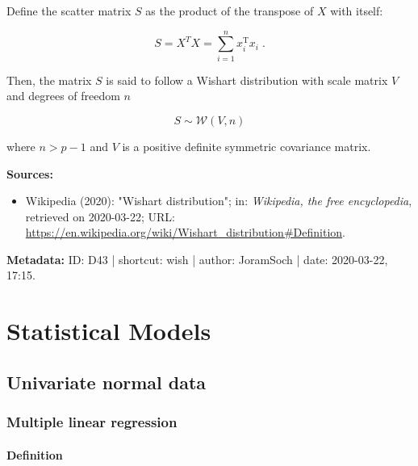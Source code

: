 \documentclass[a4paper,12pt,twoside]{book}
\begin{document}
Define the scatter matrix $S$ as the product of the transpose of $X$ with itself:

\begin{equation} \label{eq:wish-scat-mat}
S = X^T X = \sum_{i=1}^n x_i^\mathrm{T} x_i \; .
\end{equation}

Then, the matrix $S$ is said to follow a Wishart distribution with scale matrix $V$ and degrees of freedom $n$

\begin{equation} \label{eq:wish-wish}
S \sim \mathcal{W}(V, n)
\end{equation}

where $n > p - 1$ and $V$ is a positive definite symmetric covariance matrix.


\vspace{1em}
\textbf{Sources:}
\begin{itemize}
\item Wikipedia (2020): "Wishart distribution"; in: \textit{Wikipedia, the free encyclopedia}, retrieved on 2020-03-22; URL: \url{https://en.wikipedia.org/wiki/Wishart_distribution#Definition}.
\end{itemize}


\vspace{1em}
\textbf{Metadata:} ID: D43 | shortcut: wish | author: JoramSoch | date: 2020-03-22, 17:15.
\vspace{1em}





\chapter{Statistical Models} \label{sec:Statistical Models} \newpage

\pagebreak
\section{Univariate normal data}

\subsection{Multiple linear regression}

\subsubsection[\textit{Definition}]{Definition} \label{sec:mlr}
\setcounter{equation}{0}
\end{document}
